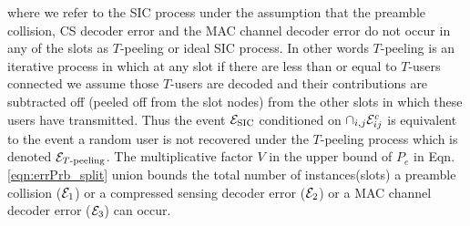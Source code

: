 where we refer to the SIC process under the assumption that the preamble collision, CS decoder error and the MAC channel decoder error do not occur in any of the slots as $T$-peeling or ideal SIC process. In other words $T$-peeling is an iterative process in which at any slot if there are less than or equal to $T$-users connected we assume those $T$-users are decoded and their contributions are subtracted off (peeled off from the slot nodes) from the other slots in which these users have transmitted. Thus the event $\mathcal{E}_{\text{SIC}}$ conditioned on $\cap_{i,j}\mathcal{E}^c_{ij}$ is equivalent to the event a random user is not recovered under the $T$-peeling process which is denoted $\mathcal{E}_{T\text{-peeling}}$. The multiplicative factor $V$ in the upper bound of $P_e$ in Eqn. \eqref{eqn:errPrb_split} union bounds the total number of instances(slots) a preamble collision ($\mathcal{E}_1$) or a compressed sensing decoder error ($\mathcal{E}_2$) or a MAC channel decoder error ($\mathcal{E}_3$) can occur.

